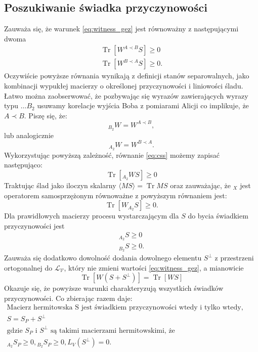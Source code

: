 \documentclass[10pt]{article} %
\DeclareMathOperator{\Trs}{Tr}
\begin{document}
\subsection{Poszukiwanie świadka przyczynowości}
Zauważa się, że warunek \eqref{eq:witness_gez} jest równoważny z następującymi dwoma
\begin{gather}
\label{eq:css2}
\Trs \left[ W^{A \prec B} S\right] \geq 0 \\
\label{eq:css}
\Trs \left[ W^{B \prec A} S\right] \geq 0.
\end{gather}
Oczywiście powyższe równania wynikają z definicji stanów separowalnych, jako kombinacji wypukłej macierzy o określonej przyczynowości i liniowości śladu.
Łatwo można zaobserwować, że pozbywając się wyrazów zawierających wyrazy typu $\dots B_2$ usuwamy korelacje wyjścia Boba z pomiarami Alicji co
implikuje, że $A \prec B$. Piszę się, że:
\begin{equation}
{}_{B_2} W = W^{A \prec B},
\end{equation}
lub analogicznie
\begin{equation}
{}_{A_2} W = W^{B \prec A}.
\end{equation}
Wykorzystując powyższą zależność, równanie \eqref{eq:css} możemy zapisać następująco:
\begin{equation}
\Trs \left[ {}_{A_2} W S\right] \geq 0
\end{equation}
Traktując ślad jako iloczyn skalarny $\langle M S \rangle = \Trs MS$ oraz zauważając, że ${}_X$ jest operatorem samosprzężonym równoważne z powyższym
równaniem jest:
\begin{equation}
\Trs \left[ W {}_{A_2}S \right] \geq 0.
\end{equation}
Dla prawidłowych macierzy procesu wystarczającym dla $S$ do bycia świadkiem przyczynowości jest 
\begin{gather}
{}_{A_2} S \geq 0 \\
{}_{B_2} S \geq 0.
\end{gather}
Zauważa się dodatkowo dowolność dodania dowolnego elementu $S^\bot$ z przestrzeni ortogonalnej do $\mathcal{L_V}$, który nie zmieni wartości \ref{eq:witness_gez}, a mianowicie
\begin{equation}
\Trs\left[W\left(S + S^\bot\right)\right] = \Trs\left[WS\right]
\end{equation}
Okazuje się, że powyższe warunki charakteryzują wszystkich świadków przyczynowości.
Co zbierając razem daje:
\begin{gather}
\text{Macierz hermitowska S jest świadkiem przyczynowości wtedy i tylko wtedy, gdy da się ją zapisać jako} \\
S = S_P + S^\bot \\
\text{gdzie $S_P$ i $S^\bot$ są takimi macierzami hermitowskimi, że} \\ 
{}_{A_2} S_P \geq 0, {}_{B_2} S_P \geq 0, L_V(S^\bot) = 0.
\end{gather}
\end{document}
